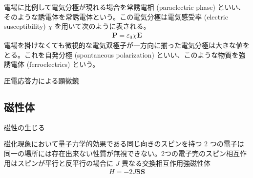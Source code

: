 \documentclass[uplatex,dvipdfmx,a4paper,11pt]{jlreq}
\newcommand{\EE}{\bm{E}}
\renewcommand{\SS}{\bm{S}}
\numberwithin{equation}{section}
\theoremstyle{definition}
\begin{document}
\begin{definition}[常誘電体]
  電場に比例して電気分極が現れる場合を常誘電相 (paraelectric phase) といい、そのような誘電体を常誘電体という。この電気分極は電気感受率 (electric susceptibility) $\chi$ を用いて次のように表される。
  \begin{align}
    \bm{P} = \varepsilon_0\chi\EE
  \end{align}
  電場を掛けなくても微視的な電気双極子が一方向に揃った電気分極は大きな値をとる。これを自発分極 (spontaneous polarization) といい、このような物質を強誘電体 (ferroelectrics) という。
\end{definition}

圧電応答力による顕微鏡

\subsection{磁性体}
磁性の生じる
\begin{definition}[強磁性体]
  磁化現象において量子力学的効果である同じ向きのスピンを持つ 2 つの電子は同一の場所には存在出来ない性質が無視できない。2つの電子完のスピン相互作用はスピンが平行と反平行の場合に $J$ 異なる交換相互作用強磁性体
  \begin{align}
    H = -2J\SS\SS
  \end{align}
\end{definition}
\end{document}
